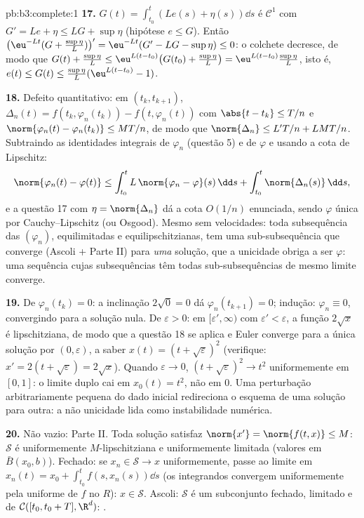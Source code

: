 \begin{solution}{pb:b3:complete:1}
\textbf{17.} $G(t) = \int_{t_0}^t(Le(s) + \eta(s))\dd s$ é
$\mathcal C^1$ com $G' = Le + \eta \leq LG + \sup\eta$
(hipótese $e \leq G$). Então $\bigl(\eu^{-Lt}(G +
\tfrac{\sup\eta}L)\bigr)' = \eu^{-Lt}(G' - LG - \sup\eta)
\leq 0$: o colchete decresce, de modo que $G(t) + \frac{\sup\eta}L
\leq \eu^{L(t - t_0)}\bigl(G(t_0) + \frac{\sup\eta}L\bigr) =
\eu^{L(t-t_0)}\frac{\sup\eta}L$, isto é, $e(t) \leq G(t) \leq
\frac{\sup\eta}L(\eu^{L(t-t_0)} - 1)$.

\textbf{18.} Defeito quantitativo: em $(t_k, t_{k+1})$,
$\Delta_n(t) = f(t_k, \varphi_n(t_k)) - f(t, \varphi_n(t))$
com $\abs{t - t_k} \leq T/n$ e $\norm{\varphi_n(t) -
\varphi_n(t_k)} \leq MT/n$, de modo que $\norm{\Delta_n} \leq L'T/n +
LMT/n$. Subtraindo as identidades integrais de $\varphi_n$
(questão 5) e de $\varphi$ e usando a cota de Lipschitz:
\[
\norm{\varphi_n(t) - \varphi(t)} \leq
\int_{t_0}^t L\,\norm{\varphi_n - \varphi}(s)\,\dd s +
\int_{t_0}^t\norm{\Delta_n(s)}\,\dd s,
\]
e a questão 17 com $\eta = \norm{\Delta_n}$ dá a cota
$O(1/n)$ enunciada, sendo $\varphi$ única por
Cauchy--Lipschitz (ou Osgood). Mesmo sem velocidades: toda
subsequência das $(\varphi_n)$, equilimitadas e equilipschitzianas,
tem uma sub-subsequência que converge (Ascoli + Parte II) para
\emph{uma} solução, que a unicidade obriga a ser $\varphi$:
uma sequência cujas subsequências têm todas sub-subsequências
de mesmo limite converge.

\textbf{19.} De $\varphi_n(t_k) = 0$: a inclinação $2\sqrt0 =
0$ dá $\varphi_n(t_{k+1}) = 0$; indução: $\varphi_n
\equiv 0$, convergindo para a solução nula. De
$\varepsilon > 0$: em $[\varepsilon', \infty)$ com
$\varepsilon' < \varepsilon$, a função $2\sqrt x$ é
lipschitziana, de modo que a questão 18 se aplica e Euler converge para a
única solução por $(0, \varepsilon)$, a saber $x(t) =
(t + \sqrt\varepsilon)^2$ (verifique: $x' = 2(t + \sqrt
\varepsilon) = 2\sqrt x$). Quando $\varepsilon \to 0$, $(t +
\sqrt\varepsilon)^2 \to t^2$ uniformemente em $[0,1]$: o limite
duplo cai em $x_0(t) = t^2$, não em $0$. Uma perturbação arbitrariamente
pequena do dado inicial redireciona o esquema de uma solução para outra:
a não unicidade lida como instabilidade numérica.

\textbf{20.} Não vazio: Parte II. Toda solução satisfaz
$\norm{x'} = \norm{f(t, x)} \leq M$: $\mathcal S$ é
uniformemente $M$-lipschitziana e uniformemente limitada (valores em
$\bar B(x_0, b)$). Fechado: se $x_n \in \mathcal S \to x$
uniformemente, passe ao limite em $x_n(t) = x_0 +
\int_{t_0}^tf(s, x_n(s))\dd s$ (os integrandos convergem
uniformemente pela  uniforme de $f$ no  $R$):
$x \in \mathcal S$. Ascoli: $\mathcal S$ é um subconjunto fechado,
limitado e  de $\mathcal C([t_0, t_0+T],
\R^d)$: .


\end{solution}
